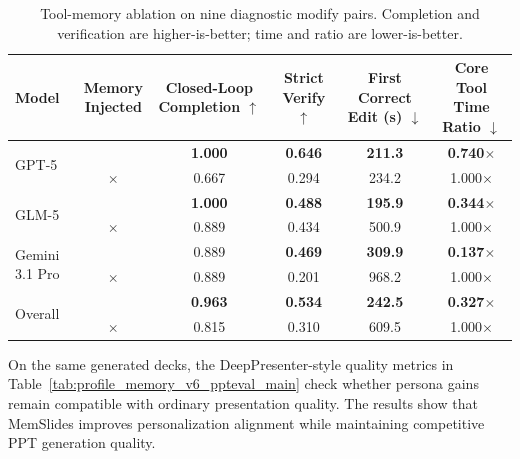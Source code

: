 \documentclass{llmxive}
\providecommand{\methodname}{MemSlides\xspace}
\providecommand{\arraystretch}{1.0}
\providecommand{\toolmemorymultiheader}[1]{\shortstack[c]{#1}}
\providecommand{\cmark}{\checkmark}
\providecommand{\xmark}{\(\times\)}
\providecommand{\toolmemoryyes}{\cmark}
\providecommand{\toolmemoryno}{\xmark}
\begin{document}
\begin{table}[t]
\centering
\small
\setlength{\tabcolsep}{6pt}
\renewcommand{\arraystretch}{0.9}
\renewcommand{\toolmemorymultiheader}[1]{\shortstack[c]{#1}}
\providecommand{\cmark}{\checkmark}
\providecommand{\xmark}{\(\times\)}
\renewcommand{\toolmemoryyes}{\cmark}
\renewcommand{\toolmemoryno}{\xmark}
\begin{tabular*}{\textwidth}{@{\extracolsep{\fill}}lccccc@{}}
\toprule
Model & \toolmemorymultiheader{Memory\\Injected} &
\toolmemorymultiheader{Closed-Loop\\Completion $\uparrow$} &
\toolmemorymultiheader{Strict\\Verify $\uparrow$} &
\toolmemorymultiheader{First Correct\\Edit (s) $\downarrow$} &
\toolmemorymultiheader{Core Tool\\Time Ratio $\downarrow$} \\
\midrule
\multirow{2}{*}{GPT-5} & \toolmemoryyes{} & \textbf{1.000} & \textbf{0.646} & \textbf{211.3} & \textbf{0.740$\times$} \\
 & \toolmemoryno{} & 0.667 & 0.294 & 234.2 & 1.000$\times$ \\
\midrule
\multirow{2}{*}{GLM-5} & \toolmemoryyes{} & \textbf{1.000} & \textbf{0.488} & \textbf{195.9} & \textbf{0.344$\times$} \\
 & \toolmemoryno{} & 0.889 & 0.434 & 500.9 & 1.000$\times$ \\
\midrule
\multirow{2}{*}{Gemini 3.1 Pro} & \toolmemoryyes{} & 0.889 & \textbf{0.469} & \textbf{309.9} & \textbf{0.137$\times$} \\
 & \toolmemoryno{} & 0.889 & 0.201 & 968.2 & 1.000$\times$ \\
\midrule
\multirow{2}{*}{Overall} & \toolmemoryyes{} & \textbf{0.963} & \textbf{0.534} & \textbf{242.5} & \textbf{0.327$\times$} \\
 & \toolmemoryno{} & 0.815 & 0.310 & 609.5 & 1.000$\times$ \\
\bottomrule
\end{tabular*}
\caption{Tool-memory ablation on nine diagnostic modify pairs. Completion and
verification are higher-is-better; time and ratio are lower-is-better.}
\label{tab:tool_memory_table1_redesign}
\end{table}




On the same generated decks, the DeepPresenter-style quality metrics in
Table~\ref{tab:profile_memory_v6_ppteval_main} check whether persona gains
remain compatible with ordinary presentation quality. The results show that
\methodname improves personalization alignment while maintaining competitive
PPT generation quality.
\end{document}
